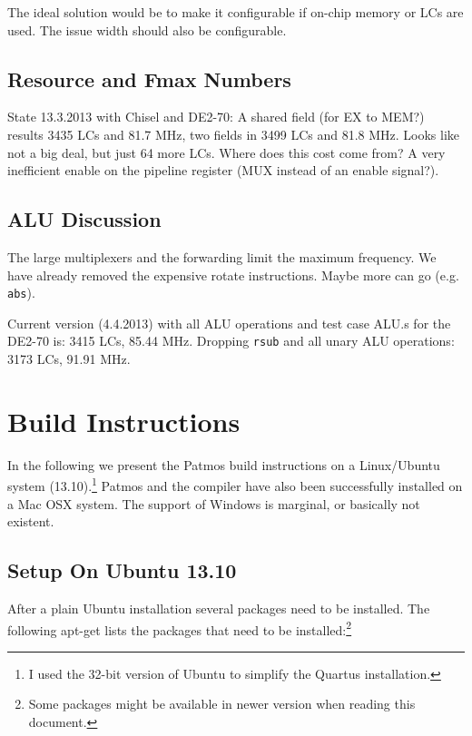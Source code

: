 \documentclass[a4paper,fontsize=10pt,twoside,DIV15,BCOR12mm,headinclude=true,footinclude=false,pagesize,bibtotoc]{scrbook}
\newcommand{\code}[1]{{\texttt{#1}}}
\newcommand{\comment}[3]{

\textsf{\textbf{#1}} {\color{#3}#2}}
\newcommand{\martin}[1]{\comment{Martin}{#1}{Blue}}
\renewcommand{\martin}[1]{}
\begin{document}
The ideal solution would be to make it configurable if on-chip memory or
LCs are used. The issue width should also be configurable.




\section{Resource and Fmax Numbers}

State 13.3.2013 with Chisel and DE2-70: A shared field (for EX to MEM?) results 3435 LCs
and 81.7 MHz, two fields in 3499 LCs and 81.8 MHz. Looks like not a big deal,
but just 64 more LCs. Where does this cost come from? A very inefficient
enable on the pipeline register (MUX instead of an enable signal?).

\martin{Update with reduced ALU muxes and also with additional second
ALU pipeline (forwarding). Is dual issue configurable?}

\section{ALU Discussion}

The large multiplexers and the forwarding limit the maximum frequency.
We have already removed the expensive rotate instructions. Maybe more
can go (e.g. \code{abs}).

Current version (4.4.2013) with all ALU operations and test case ALU.s
for the DE2-70 is: 3415 LCs, 85.44 MHz. Dropping \code{rsub} and all unary
ALU operations: 3173 LCs, 91.91 MHz.

\chapter{Build Instructions}
\label{ch:build_instructions}

In the following we present the Patmos build instructions on a Linux/Ubuntu
system (13.10).\footnote{I used the 32-bit version of Ubuntu to simplify the Quartus installation.}
Patmos and the compiler have also been successfully installed on a Mac OSX
system. The support of Windows is marginal, or basically not existent.


\section{Setup On Ubuntu 13.10}

After a plain Ubuntu installation several packages need to be installed.
The following apt-get lists the packages that need to be
installed:\footnote{Some packages might be available in newer version
when reading this document.}
\end{document}
